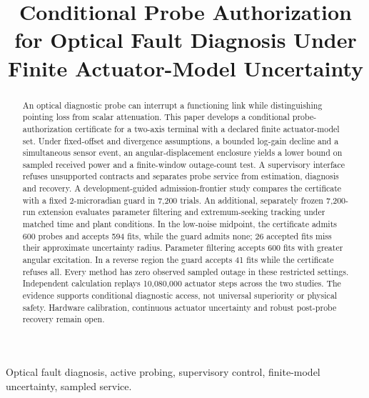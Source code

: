 \documentclass[10pt,journal]{IEEEtran}
\begin{document}
\title{Conditional Probe Authorization for Optical Fault Diagnosis Under Finite Actuator-Model Uncertainty}
\author{}
\maketitle
\begin{abstract}
An optical diagnostic probe can interrupt a functioning link while distinguishing pointing loss from scalar attenuation. This paper develops a conditional probe-authorization certificate for a two-axis terminal with a declared finite actuator-model set. Under fixed-offset and divergence assumptions, a bounded log-gain decline and a simultaneous sensor event, an angular-displacement enclosure yields a lower bound on sampled received power and a finite-window outage-count test. A supervisory interface refuses unsupported contracts and separates probe service from estimation, diagnosis and recovery. A development-guided admission-frontier study compares the certificate with a fixed 2-microradian guard in 7,200 trials. An additional, separately frozen 7,200-run extension evaluates parameter filtering and extremum-seeking tracking under matched time and plant conditions. In the low-noise midpoint, the certificate admits 600 probes and accepts 594 fits, while the guard admits none; 26 accepted fits miss their approximate uncertainty radius. Parameter filtering accepts 600 fits with greater angular excitation. In a reverse region the guard accepts 41 fits while the certificate refuses all. Every method has zero observed sampled outage in these restricted settings. Independent calculation replays 10,080,000 actuator steps across the two studies. The evidence supports conditional diagnostic access, not universal superiority or physical safety. Hardware calibration, continuous actuator uncertainty and robust post-probe recovery remain open.
\end{abstract}
\begin{IEEEkeywords}Optical fault diagnosis, active probing, supervisory control, finite-model uncertainty, sampled service.\end{IEEEkeywords}










\end{document}

